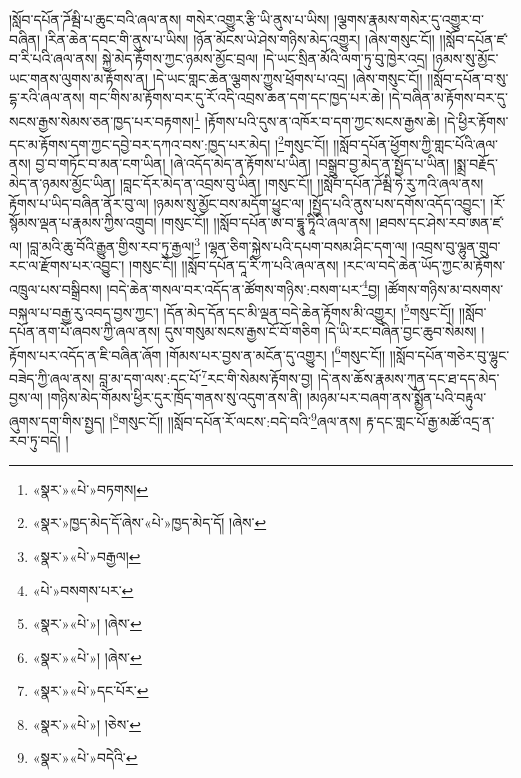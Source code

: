 །སློབ་དཔོན་ཌོམྦི་པ་ཆུང་བའི་ཞལ་ནས། གསེར་འགྱུར་རྩི་ཡི་ནུས་པ་ཡིས། །ལྕགས་རྣམས་གསེར་དུ་འགྱུར་བ་བཞིན། །རིན་ཆེན་དབང་གི་ནུས་པ་ཡིས། །ཉོན་མོངས་ཡེ་ཤེས་གཉིས་མེད་འགྱུར། །ཞེས་གསུང་ངོ།། །།སློབ་དཔོན་ཛ་བ་རི་པའི་ཞལ་ནས། སྐྱེ་མེད་རྟོགས་ཀྱང་ཉམས་མྱོང་བྲལ། །དེ་ཡང་སྲིན་མོའི་ལག་ཏུ་བུ་ཁྱེར་འདྲ། །ཉམས་སུ་མྱོང་ཡང་གནས་ལུགས་མ་རྟོགས་ན། །དེ་ཡང་གླང་ཆེན་ལྕགས་ཀྱུས་ཕྲོགས་པ་འདྲ། །ཞེས་གསུང་ངོ།། །།སློབ་དཔོན་བ་སུ་དྷ་རའི་ཞལ་ནས། གང་གིས་མ་རྟོགས་བར་དུ་རོ་འདི་འབྲས་ཆན་དག་དང་ཁྱད་པར་ཆེ། །དེ་བཞིན་མ་རྟོགས་བར་དུ་སངས་རྒྱས་སེམས་ཅན་ཁྱད་པར་བརྟགས།\footnote{«སྣར་»«པེ་»བཏགས།} །རྟོགས་པའི་དུས་ན་འཁོར་བ་དག་ཀྱང་སངས་རྒྱས་ཆེ། །དེ་ཕྱིར་རྟོགས་དང་མ་རྟོགས་དག་ཀྱང་དབྱེ་བར་དཀའ་བས་:ཁྱད་པར་མེད། །\footnote{«སྣར་»ཁྱད་མེད་དོ་ཞེས་«པེ་»ཁྱད་མེད་དོ། །ཞེས་}གསུང་ངོ།། །།སློབ་དཔོན་ཕྱོགས་ཀྱི་གླང་པོའི་ཞལ་ནས། བྱ་བ་གཏོང་བ་མན་ངག་ཡིན། །ཞེ་འདོད་མེད་ན་རྟོགས་པ་ཡིན། །བསྒྲུབ་བྱ་མེད་ན་སྤྱོད་པ་ཡིན། །སྨྲ་བརྗོད་མེད་ན་ཉམས་མྱོང་ཡིན། །བླང་དོར་མེད་ན་འབྲས་བུ་ཡིན། །གསུང་ངོ།། །།སློབ་དཔོན་ཌོམྦི་ཧེ་རུ་ཀའི་ཞལ་ནས། རྟོགས་པ་ཡིད་བཞིན་ནོར་བུ་ལ། །ཉམས་སུ་མྱོང་བས་མདོག་ཕྱུང་ལ། །སྤྱོད་པའི་ནུས་པས་དགོས་འདོད་འབྱུང་། །རོ་སྙོམས་ལྡན་པ་རྣམས་ཀྱིས་འགྲུབ། །གསུང་ངོ།། །།སློབ་དཔོན་ཨ་བ་དྷཱུ་ཏཱིའི་ཞལ་ནས། །ཐབས་དང་ཤེས་རབ་ཨན་ཛ་ལ། །བླ་མའི་ཆུ་བོའི་རྒྱུན་གྱིས་རབ་ཏུ་རྒྱལ།\footnote{«སྣར་»«པེ་»བརྒྱལ།} །ལྷན་ཅིག་སྐྱེས་པའི་དཔག་བསམ་ཤིང་དག་ལ། །འབྲས་བུ་ལྷུན་གྲུབ་རང་ལ་རྫོགས་པར་འབྱུང་། །གསུང་ངོ།། །།སློབ་དཔོན་དཱ་རི་ཀ་པའི་ཞལ་ནས། །རང་ལ་བདེ་ཆེན་ཡོད་ཀྱང་མ་རྟོགས་འཁྲུལ་པས་བསྒྲིབས། །བདེ་ཆེན་གསལ་བར་འདོད་ན་ཚོགས་གཉིས་:བསག་པར་\footnote{«པེ་»བསགས་པར་}བྱ། །ཚོགས་གཉིས་མ་བསགས་བསྐལ་པ་བརྒྱ་རུ་འབད་བྱས་ཀྱང་། །དོན་མེད་དོན་དང་མི་ལྡན་བདེ་ཆེན་རྟོགས་མི་འགྱུར། །\footnote{«སྣར་»«པེ་»། །ཞེས་}གསུང་ངོ།། །།སློབ་དཔོན་ནག་པོ་ཞབས་ཀྱི་ཞལ་ནས། དུས་གསུམ་སངས་རྒྱས་ངོ་བོ་གཅིག །དེ་ཡི་རང་བཞིན་བྱང་ཆུབ་སེམས། །རྟོགས་པར་འདོད་ན་ཇི་བཞིན་ཞོག །གོམས་པར་བྱས་ན་མངོན་དུ་འགྱུར། །\footnote{«སྣར་»«པེ་»། །ཞེས་}གསུང་ངོ།། །།སློབ་དཔོན་གཅེར་བུ་ལྷུང་བཟེད་ཀྱི་ཞལ་ནས། བླ་མ་དག་ལས་:དང་པོ་\footnote{«སྣར་»«པེ་»དང་པོར་}རང་གི་སེམས་རྟོགས་བྱ། །དེ་ནས་ཆོས་རྣམས་ཀུན་དང་ཐ་དད་མེད་བྱས་ལ། །གཉིས་མེད་གོམས་ཕྱིར་དུར་ཁྲོད་གནས་སུ་འདུག་ནས་ནི། །མཉམ་པར་བཞག་ནས་སྨྱོན་པའི་བརྟུལ་ཞུགས་དག་གིས་སྤྱད། །\footnote{«སྣར་»«པེ་»། །ཅེས་}གསུང་ངོ།། །།སློབ་དཔོན་རོ་ལངས་:བདེ་བའི་\footnote{«སྣར་»«པེ་»བདེའི་}ཞལ་ནས། རྟ་དང་གླང་པོ་རྒྱ་མཚོ་འདྲ་ན་རབ་ཏུ་བདེ། །
